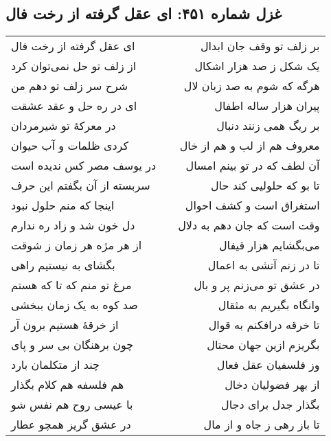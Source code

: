 \begin{center}
\section*{غزل شماره ۴۵۱: ای عقل گرفته از رخت فال}
\label{sec:451}
\begin{longtable}{l p{0.5cm} r}
ای عقل گرفته از رخت فال
&&
بر زلف تو وقف جان ابدال
\\
از زلف تو حل نمی‌توان کرد
&&
یک شکل ز صد هزار اشکال
\\
شرح سر زلف تو دهم من
&&
هرگه که شوم به صد زبان لال
\\
ای در ره حل و عقد عشقت
&&
پیران هزار ساله اطفال
\\
در معرکهٔ تو شیرمردان
&&
بر ریگ همی زنند دنبال
\\
کردی ظلمات و آب حیوان
&&
معروف هم از لب و هم از خال
\\
در یوسف مصر کس ندیده است
&&
آن لطف که در تو بینم امسال
\\
سربسته از آن بگفتم این حرف
&&
تا بو که حلولیی کند حال
\\
اینجا که منم حلول نبود
&&
استغراق است و کشف احوال
\\
دل خون شد و زاد ره ندارم
&&
وقت است که جان دهم به دلال
\\
از هر مژه هر زمان ز شوقت
&&
می‌بگشایم هزار قیفال
\\
بگشای به نیستیم راهی
&&
تا در زنم آتشی به اعمال
\\
مرغ تو منم که تا که هستم
&&
در عشق تو می‌زنم پر و بال
\\
صد کوه به یک زمان ببخشی
&&
وانگاه بگیریم به مثقال
\\
از خرقهٔ هستیم برون آر
&&
تا خرقه درافکنم به قوال
\\
چون برهنگان بی سر و پای
&&
بگریزم ازین جهان محتال
\\
چند از متکلمان بارد
&&
وز فلسفیان عقل فعال
\\
هم فلسفه هم کلام بگذار
&&
از بهر فضولیان دخال
\\
با عیسی روح هم نفس شو
&&
بگذار جدل برای دجال
\\
در عشق گریز همچو عطار
&&
تا باز رهی ز جاه و از مال
\\
\end{longtable}
\end{center}
